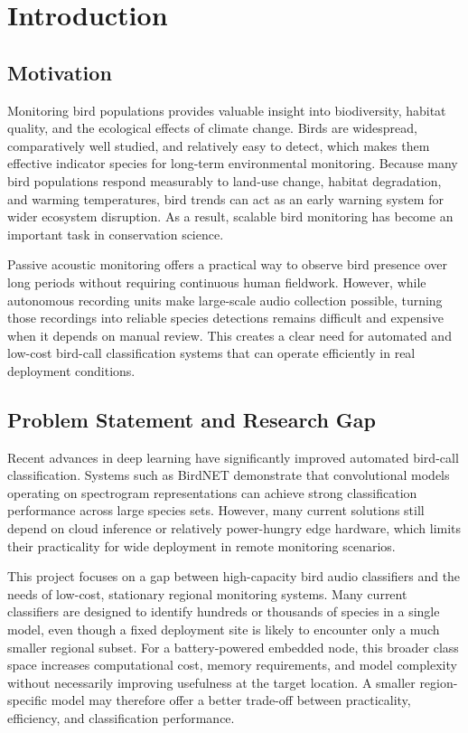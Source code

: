 \documentclass[conference]{IEEEtran}
\begin{document}
\section{Introduction}

\subsection{Motivation}
Monitoring bird populations provides valuable insight into biodiversity, habitat quality, and the ecological effects of climate change. Birds are widespread, comparatively well studied, and relatively easy to detect, which makes them effective indicator species for long-term environmental monitoring. Because many bird populations respond measurably to land-use change, habitat degradation, and warming temperatures, bird trends can act as an early warning system for wider ecosystem disruption. As a result, scalable bird monitoring has become an important task in conservation science.

Passive acoustic monitoring offers a practical way to observe bird presence over long periods without requiring continuous human fieldwork. However, while autonomous recording units make large-scale audio collection possible, turning those recordings into reliable species detections remains difficult and expensive when it depends on manual review. This creates a clear need for automated and low-cost bird-call classification systems that can operate efficiently in real deployment conditions.

\subsection{Problem Statement and Research Gap}
Recent advances in deep learning have significantly improved automated bird-call classification. Systems such as BirdNET demonstrate that convolutional models operating on spectrogram representations can achieve strong classification performance across large species sets. However, many current solutions still depend on cloud inference or relatively power-hungry edge hardware, which limits their practicality for wide deployment in remote monitoring scenarios.

This project focuses on a gap between high-capacity bird audio classifiers and the needs of low-cost, stationary regional monitoring systems. Many current classifiers are designed to identify hundreds or thousands of species in a single model, even though a fixed deployment site is likely to encounter only a much smaller regional subset. For a battery-powered embedded node, this broader class space increases computational cost, memory requirements, and model complexity without necessarily improving usefulness at the target location. A smaller region-specific model may therefore offer a better trade-off between practicality, efficiency, and classification performance.
\end{document}
